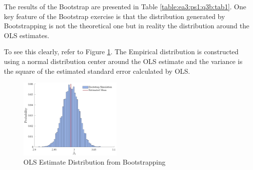 \documentclass{article}
\begin{document}
\begin{solution}
The results of the Bootstrap are presented in Table \ref{table:ea3:ps1:q3b:tab1}. One key feature of the Bootstrap exercise is that the distribution generated by Bootstrapping is not the theoretical one but in reality the distribution around the OLS estimates. 

To see this clearly, refer to Figure \ref{ea3:ps1:q3b:fig1}. The Empirical distribution is constructed using a normal distribution center around the OLS estimate and the variance is the square of the estimated standard error calculated by OLS. 
\begin{figure}[htb]
    \centering
    \caption{OLS Estimate Distribution from Bootstrapping}
    \label{ea3:ps1:q3b:fig1}
    \includegraphics[width=0.45\textwidth]{Figures/p3qb.pdf}
\end{figure}
\end{solution}
\end{document}
